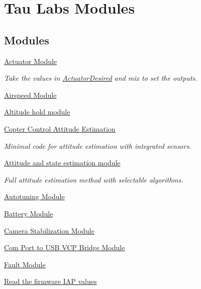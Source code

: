 \hypertarget{group___tau_labs_modules}{\section{\-Tau \-Labs \-Modules}
\label{group___tau_labs_modules}
}
\subsection*{\-Modules}
\begin{DoxyCompactItemize}
\item 
\hyperlink{group___actuator_module}{\-Actuator Module}
\begin{DoxyCompactList}\small\item\em \-Take the values in \hyperlink{group___actuator_desired}{\-Actuator\-Desired} and mix to set the outputs. \end{DoxyCompactList}\item 
\hyperlink{group___airspeed_module}{\-Airspeed Module}
\item 
\hyperlink{group___altitude_hold_module}{\-Altitude hold module}
\item 
\hyperlink{group___attitude_module_c_c}{\-Copter Control Attitude Estimation}
\begin{DoxyCompactList}\small\item\em \-Minimal code for attitude estimation with integrated sensors. \end{DoxyCompactList}\item 
\hyperlink{group___attitude_module}{\-Attitude and state estimation module}
\begin{DoxyCompactList}\small\item\em \-Full attitude estimation method with selectable algorithms. \end{DoxyCompactList}\item 
\hyperlink{group___autotuning_module}{\-Autotuning Module}
\item 
\hyperlink{group___battery_module}{\-Battery Module}
\item 
\hyperlink{group___camera_stab}{\-Camera Stabilization Module}
\item 
\hyperlink{group___com_usb_bridge_module}{\-Com Port to U\-S\-B V\-C\-P Bridge Module}
\item 
\hyperlink{group___fault_module}{\-Fault Module}
\item 
\hyperlink{group___firmware_i_a_p_module}{\-Read the firmware I\-A\-P values}
\item 

\end{DoxyCompactItemize}
